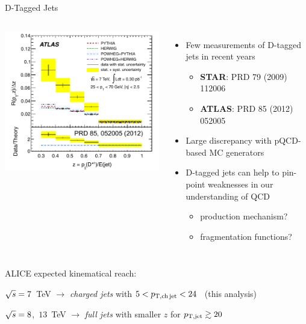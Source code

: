 \documentclass[xcolor={usenames,dvipsnames}]{beamer}
\begin{document}
\begin{frame}{D-Tagged Jets}
\begin{columns}
\includegraphics[width=\textwidth]{img/ATLAS_DStarJets}
\begin{itemize}
\item \alert{Few measurements} of D-tagged jets in recent years
\begin{itemize}
\setlength\itemsep{0em}
\item {\scriptsize \textbf{STAR}: PRD 79 (2009) 112006}
\item {\scriptsize \textbf{ATLAS}: PRD 85 (2012) 052005}
\end{itemize}
\item \alert{Large discrepancy} with pQCD-based MC generators
\item D-tagged jets can help to pin-point weaknesses in our understanding of QCD
\begin{itemize}
\item production mechanism?
\item fragmentation functions?
\end{itemize}
\end{itemize}
\end{columns}

\smallskip
{\small ALICE expected kinematical reach:}
\begin{itemize}
{\small \item $\sqrt{s}=7$~TeV $\rightarrow$ \emph{charged jets} with \alert{$5<p_{\mathrm{T,ch\, jet}}<24$~\GeVc} (this analysis)}
{\small \item $\sqrt{s}=8$,~$13$~TeV $\rightarrow$ \emph{full jets} with \alert{smaller $z$ for $p_{\mathrm{T,jet}} \gtrsim 20$~\GeVc}}
\end{itemize}
\end{frame}
\end{document}
